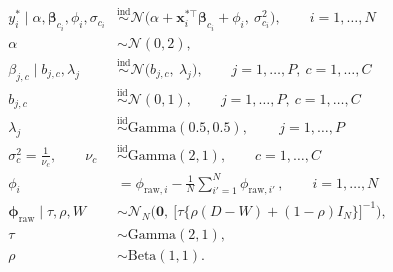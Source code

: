 \begin{align*}
y_i^\ast \mid \alpha,\boldsymbol{\beta}_{c_i},\phi_i,\sigma_{c_i}
&\stackrel{\text{ind}}{\sim} \mathcal{N}\!\Big(\alpha+\mathbf{x}_i^{\ast\top}\boldsymbol{\beta}_{c_i}+\phi_i,\ \sigma_{c_i}^{2}\Big),
\qquad i=1,\dots,N\\[2mm]
\alpha &\sim \mathcal{N}(0,2),\\
\beta_{j,c}\mid b_{j,c},\lambda_{j}
&\stackrel{\text{ind}}{\sim} \mathcal{N}\!\Big(b_{j,c},\ \lambda_{j} \Big),
\qquad j=1,\dots,P,\ c=1,\dots,C\\
b_{j,c} &\stackrel{\text{iid}}{\sim} \mathcal{N}(0,1),
\qquad j=1,\dots,P,\ c = 1,\dots,C\\
\lambda_{j} &\stackrel{\text{iid}}{\sim} \mathrm{Gamma}(0.5,0.5), \,
\qquad j=1,\dots,P\\
\sigma^2_c = \frac{1}{\nu_c}, \qquad \nu_c &\stackrel{\text{iid}}{\sim} \mathrm{Gamma}(2,1),
\qquad c=1,\dots,C\\
\phi_i &= \phi_{\mathrm{raw},i}-\frac1N\sum_{i'=1}^N \phi_{\mathrm{raw},i'} \, ,
\qquad i=1,\dots,N\\
\boldsymbol{\phi}_{\mathrm{raw}}\mid \tau,\rho,W
&\sim \mathcal{N}_N\!\Big(
\mathbf{0},\ \big[\tau\{\rho(D-W)+(1-\rho)I_N\}\big]^{-1}
\Big),\\
\tau &\sim \mathrm{Gamma}(2,1),\\
\rho &\sim \mathrm{Beta}(1,1).
\end{align*}